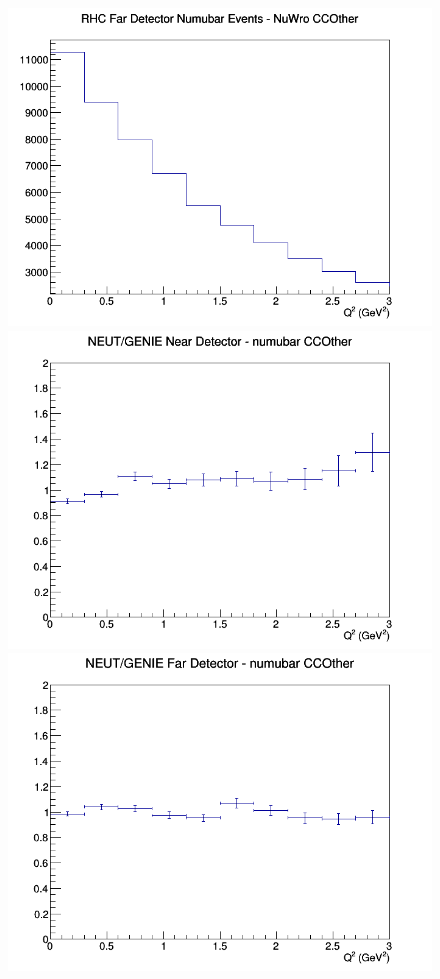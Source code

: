 \begin{figure}[h]
\endminipage
{}
\includegraphics[width=\linewidth]{eff_Q2/LAr/CCOther_RHC_FD_numubar_Q2_NuWro.png}
\endminipage
\newline
{}
\includegraphics[width=\linewidth]{eff_Q2/LAr/ratios/CCOther_NEUT_GENIE_numubar_near_Q2.png}
\endminipage
{}
\includegraphics[width=\linewidth]{eff_Q2/LAr/ratios/CCOther_NEUT_GENIE_numubar_far_Q2.png}

\end{figure}
